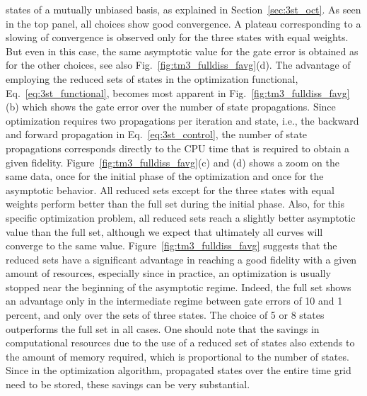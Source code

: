 states of a mutually unbiased basis, as explained in
Section~\ref{sec:3st_oct}.
As seen in the top panel, all choices %
show good convergence. A plateau corresponding to a slowing of
convergence is observed only for the three
states with equal weights. But even in this case, the same asymptotic
value for the gate error is obtained as for the other choices, see also
Fig.~\ref{fig:tm3_fulldiss_favg}(d).
The advantage of employing the reduced sets of
states in the optimization functional, Eq.~\eqref{eq:3st_functional},
becomes most apparent in Fig.~\ref{fig:tm3_fulldiss_favg}(b)
which shows the gate error over the number of state
propagations. Since optimization requires two propagations per
iteration and state, i.e., the
backward and forward propagation in Eq.~\eqref{eq:3st_control}, the number
of state propagations corresponds directly to the CPU time that is
required to obtain a given
fidelity. Figure~\ref{fig:tm3_fulldiss_favg}(c) and (d)
shows a zoom on the same data, once for the initial phase
of the optimization and once for the asymptotic behavior. All reduced sets
except for the three states with equal weights perform better than the
full set during the
initial phase.  Also, for this specific optimization problem, all reduced sets
reach a slightly better asymptotic value than the full set, although we
expect that ultimately all curves will converge to the same value.
Figure~\ref{fig:tm3_fulldiss_favg} suggests that
the reduced sets have a significant
advantage in reaching a good fidelity with a given amount of resources, especially
since in practice, an optimization is usually stopped near the beginning of the
asymptotic regime. Indeed, the full set shows an advantage only in the
intermediate regime between gate errors of 10 and 1 percent, and only over the
sets of three states. The choice of 5 or 8 states outperforms the full set in
all cases.
One should note that the savings in computational resources due to the
use of a reduced set of
states also extends to the amount of memory required, which is proportional to
the number of states. Since in the optimization algorithm, propagated states
over the entire time grid need to be stored, these savings can be very
substantial.

